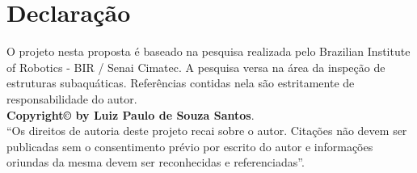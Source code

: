 \chapter*{Declaração}
O projeto nesta proposta é baseado na pesquisa realizada pelo Brazilian Institute of Robotics - BIR / Senai Cimatec. A pesquisa versa na área da inspeção de estruturas subaquáticas. Referências contidas nela são estritamente de responsabilidade do autor.\\
\vspace*{8cm}
\vfill
\noindent \textbf{Copyright\copyright{} by Luiz Paulo de Souza Santos}.\\
``Os direitos de autoria deste projeto recai sobre o autor. Citações não devem ser publicadas sem o consentimento prévio por escrito do autor e informações oriundas da mesma devem ser reconhecidas e referenciadas''.




\tableofcontents
\listoffigures
\listoftables
\clearpage











